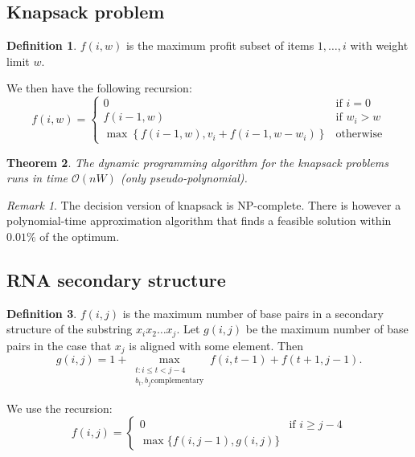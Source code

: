\documentclass[10pt, oneside, reqno]{amsart}
\theoremstyle{plain}%
\newtheorem{thm}{Theorem}[section]
\theoremstyle{definition}
\newtheorem{defn}[thm]{Definition}
\theoremstyle{remark}
\newtheorem*{rem}{Remark}
\newcommand{\bigo}[1]{\mathcal{O}(#1)}
\begin{document}
\subsection{Knapsack problem} %
\label{sub:knapsack_problem}

\begin{defn}
	$f(i,w)$ is the maximum profit subset of items $1, \dots, i$ with weight limit $w$.  
\end{defn}

We then have the following recursion:
\[
	f(i,w) = \begin{cases}
		0 		&\text{if $i = 0$}\\
		f(i-1,w)&\text{if $w_i > w$}\\
		\max \left\{ f(i-1,w), v_i + f(i-1, w - w_i)\right\} &\text{otherwise}
	\end{cases}
\]


\begin{thm}
	The dynamic programming algorithm for the knapsack problems runs in time $\bigo{nW}$ (only pseudo-polynomial).
\end{thm}

\begin{rem}
The decision version of knapsack is NP-complete. There is however a polynomial-time approximation algorithm that finds a feasible solution within $0.01\%$ of the optimum.
\end{rem}

\subsection{RNA secondary structure} %
\label{sub:}

\begin{defn}
	$f(i,j)$ is the maximum number of base pairs in a secondary structure of the substring $x_i x_2\dots x_j$. Let $g(i, j)$ be the maximum number of base pairs in the case that $x_j$ is aligned with some element. Then $$g(i, j) = 1 + \max_{\substack{t:i \leq t < j-4 \\ b_t, b_j \text{complementary}}} f(i,t-1) + f(t+1, j-1).$$
\end{defn}

We use the recursion:
\[
	f(i,j) = \begin{cases}
		0 &\text{if $i \geq j-4$}\\
		\max \{f(i,j-1), g(i, j) \}
	\end{cases}
\]


\end{document}
